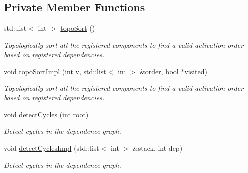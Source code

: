 \subsection*{Private Member Functions}
\begin{DoxyCompactItemize}
\item 
std\+::list$<$ int $>$ \hyperlink{structvt_1_1runtime_1_1component_1_1_component_pack_a5ca923fe22474d1c26a97d6d5dbfc0a3}{topo\+Sort} ()
\begin{DoxyCompactList}\small\item\em Topologically sort all the registered components to find a valid activation order based on registered dependencies. \end{DoxyCompactList}\item 
void \hyperlink{structvt_1_1runtime_1_1component_1_1_component_pack_a7cb370457771ba9ebccd8892ffdafca9}{topo\+Sort\+Impl} (int v, std\+::list$<$ int $>$ \&order, bool $\ast$visited)
\begin{DoxyCompactList}\small\item\em Topologically sort all the registered components to find a valid activation order based on registered dependencies. \end{DoxyCompactList}\item 
void \hyperlink{structvt_1_1runtime_1_1component_1_1_component_pack_a8e76881b315cccf8171f177a84d66f83}{detect\+Cycles} (int root)
\begin{DoxyCompactList}\small\item\em Detect cycles in the dependence graph. \end{DoxyCompactList}\item 
void \hyperlink{structvt_1_1runtime_1_1component_1_1_component_pack_acbe1421990318c9c43d5a83add91fa31}{detect\+Cycles\+Impl} (std\+::list$<$ int $>$ \&stack, int dep)
\begin{DoxyCompactList}\small\item\em Detect cycles in the dependence graph. \end{DoxyCompactList}\end{DoxyCompactItemize}
